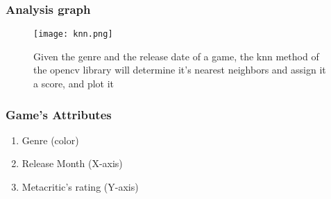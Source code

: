 \documentclass{beamer}
\begin{document}

\begin{frame}
\frametitle{Analysis graph}

\begin{figure}[hb]
  \centering
  \texttt{[image: knn.png]}
  \caption[Close up of ]
   {Given the genre and the release date of a game, the knn method of the opencv library will determine it's nearest neighbors and assign it a score, and plot it}
\end{figure}

\end {frame}

\begin{frame}[fragile] 
\frametitle{Game's Attributes}
\begin{enumerate}
\item{Genre (color)}
\item{Release Month (X-axis)}
\item{Metacritic's rating (Y-axis)}
    \end{enumerate}



\end{frame}









\end{document}
